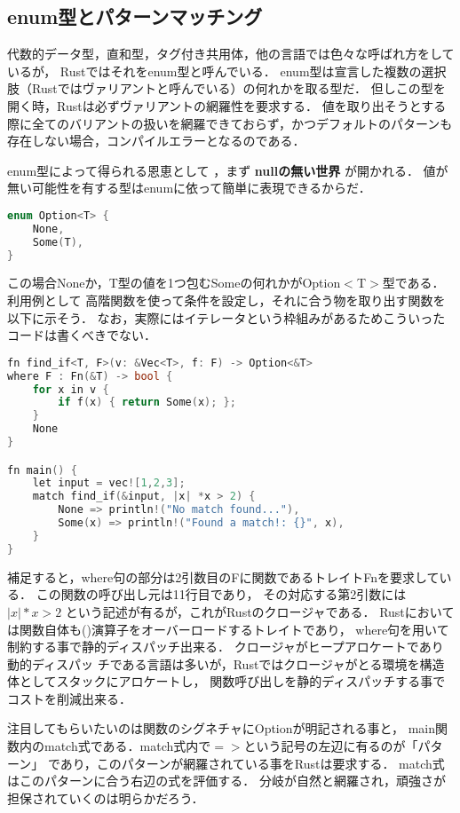 \subsection{enum型とパターンマッチング}
代数的データ型，直和型，タグ付き共用体，他の言語では色々な呼ばれ方をしているが，
Rustではそれをenum型と呼んでいる．
enum型は宣言した複数の選択肢（Rustではヴァリアントと呼んでいる）の何れかを取る型だ．
但しこの型を開く時，Rustは必ずヴァリアントの網羅性を要求する．
値を取り出そうとする際に全てのバリアントの扱いを網羅できておらず，かつデフォルトのパターンも存在しない場合，コンパイルエラーとなるのである．

enum型によって得られる恩恵として
，まず \textbf{nullの無い世界} が開かれる．
値が無い可能性を有する型はenumに依って簡単に表現できるからだ．
\begin{lstlisting}[language={C++},caption=Option型,label=option_t]
enum Option<T> {
    None,
    Some(T),
}
\end{lstlisting}
この場合Noneか，T型の値を1つ包むSomeの何れかがOption$<$T$>$型である．
利用例として
高階関数を使って条件を設定し，それに合う物を取り出す関数を以下に示そう．
なお，実際にはイテレータという枠組みがあるためこういったコードは書くべきでない．
\begin{lstlisting}[language={C++},caption=条件に応じた値が見つかれば返す関数,label=find_if]
fn find_if<T, F>(v: &Vec<T>, f: F) -> Option<&T>
where F : Fn(&T) -> bool {
    for x in v {
        if f(x) { return Some(x); };
    }
    None
}

fn main() {
    let input = vec![1,2,3];
    match find_if(&input, |x| *x > 2) {
        None => println!("No match found..."),
        Some(x) => println!("Found a match!: {}", x),
    }
}
\end{lstlisting}
補足すると，where句の部分は2引数目のFに関数であるトレイトFnを要求している．
この関数の呼び出し元は11行目であり，
その対応する第2引数には $|x| *x > 2$ という記述が有るが，これがRustのクロージャである．
Rustにおいては関数自体も()演算子をオーバーロードするトレイトであり，
where句を用いて制約する事で静的ディスパッチ出来る．
クロージャがヒープアロケートであり動的ディスパッ
チである言語は多いが，Rustではクロージャがとる環境を構造体としてスタックにアロケートし，
関数呼び出しを静的ディスパッチする事でコストを削減出来る．

注目してもらいたいのは関数のシグネチャにOptionが明記される事と，
main関数内のmatch式である．match式内で$=>$という記号の左辺に有るのが「パターン」
であり，このパターンが網羅されている事をRustは要求する．
match式はこのパターンに合う右辺の式を評価する．
分岐が自然と網羅され，頑強さが担保されていくのは明らかだろう．

